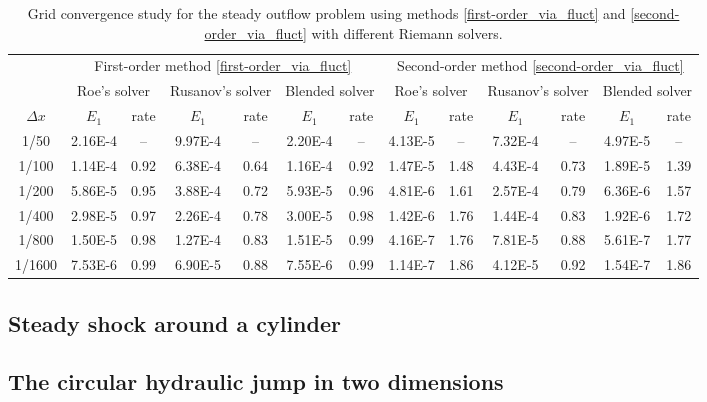 \documentclass[preprint, 11pt]{article}
\begin{document}
\begin{table}[!ht]\scriptsize
  \begin{center}
    \begin{tabular}{||c||c|c||c|c||c|c||c|c||c|c||c|c||} \hline
      & \multicolumn{6}{c||}{First-order method \eqref{first-order_via_fluct}}
      & \multicolumn{6}{c||}{Second-order method \eqref{second-order_via_fluct}} \\ \cline{2-13}
      & \multicolumn{2}{c||}{Roe's solver}  
      &\multicolumn{2}{c||}{Rusanov's solver} 
      &\multicolumn{2}{c||}{Blended solver}
      & \multicolumn{2}{c||}{Roe's solver}  
      &\multicolumn{2}{c||}{Rusanov's solver} 
      &\multicolumn{2}{c||}{Blended solver}
      \\ \cline{2-13}
      $\Delta x$ & $E_1$ & rate & $E_1$ & rate & $E_1$ & rate & $E_1$ & rate & $E_1$ & rate & $E_1$ & rate\\ \hline
      1/50   & 2.16E-4 &  --  & 9.97E-4 &   -- & 2.20E-4 & --   & 4.13E-5 &   -- & 7.32E-4 &  --  & 4.97E-5 & --   \\
      1/100  & 1.14E-4 & 0.92 & 6.38E-4 & 0.64 & 1.16E-4 & 0.92 & 1.47E-5 & 1.48 & 4.43E-4 & 0.73 & 1.89E-5 & 1.39 \\
      1/200  & 5.86E-5 & 0.95 & 3.88E-4 & 0.72 & 5.93E-5 & 0.96 & 4.81E-6 & 1.61 & 2.57E-4 & 0.79 & 6.36E-6 & 1.57 \\
      1/400  & 2.98E-5 & 0.97 & 2.26E-4 & 0.78 & 3.00E-5 & 0.98 & 1.42E-6 & 1.76 & 1.44E-4 & 0.83 & 1.92E-6 & 1.72 \\
      1/800  & 1.50E-5 & 0.98 & 1.27E-4 & 0.83 & 1.51E-5 & 0.99 & 4.16E-7 & 1.76 & 7.81E-5 & 0.88 & 5.61E-7 & 1.77 \\
      1/1600 & 7.53E-6 & 0.99 & 6.90E-5 & 0.88 & 7.55E-6 & 0.99 & 1.14E-7 & 1.86 & 4.12E-5 & 0.92 & 1.54E-7 & 1.86 \\ \hline
    \end{tabular}
    \caption{Grid convergence study for the steady outflow problem
      using methods \eqref{first-order_via_fluct} and \eqref{second-order_via_fluct}
      with different Riemann solvers.\label{table:steady_outflow}}
  \end{center}
\end{table}

\subsection{Steady shock around a cylinder}\label{sec:bow_shock}
\subsection{The circular hydraulic jump in two dimensions}\label{sec:2D_chj}
\end{document}
